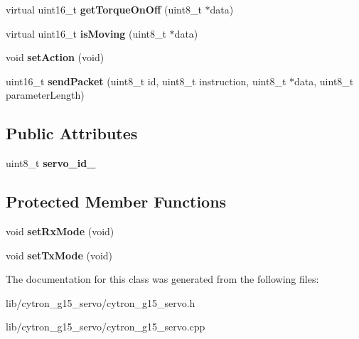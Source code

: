 \begin{DoxyCompactItemize}
\item 
virtual uint16\+\_\+t {\bfseries get\+Torque\+On\+Off} (uint8\+\_\+t $\ast$data)\hypertarget{classCytron__G15__Servo_a8d219ed8406313c53a00bddf81b90677}{}\label{classCytron__G15__Servo_a8d219ed8406313c53a00bddf81b90677}

\item 
virtual uint16\+\_\+t {\bfseries is\+Moving} (uint8\+\_\+t $\ast$data)\hypertarget{classCytron__G15__Servo_a3854ba546f35b228dc99c7c9d60bb000}{}\label{classCytron__G15__Servo_a3854ba546f35b228dc99c7c9d60bb000}

\item 
void {\bfseries set\+Action} (void)\hypertarget{classCytron__G15__Servo_a1552f7f170eb517fa76079557d9a29d5}{}\label{classCytron__G15__Servo_a1552f7f170eb517fa76079557d9a29d5}

\item 
uint16\+\_\+t {\bfseries send\+Packet} (uint8\+\_\+t id, uint8\+\_\+t instruction, uint8\+\_\+t $\ast$data, uint8\+\_\+t parameter\+Length)\hypertarget{classCytron__G15__Servo_aaab32bae80c27bc72522eb6b029a6b84}{}\label{classCytron__G15__Servo_aaab32bae80c27bc72522eb6b029a6b84}

\end{DoxyCompactItemize}
\subsection*{Public Attributes}
\begin{DoxyCompactItemize}
\item 
uint8\+\_\+t {\bfseries servo\+\_\+id\+\_\+}\hypertarget{classCytron__G15__Servo_a82c996820f49b5298d15f0628e8f2a93}{}\label{classCytron__G15__Servo_a82c996820f49b5298d15f0628e8f2a93}

\end{DoxyCompactItemize}
\subsection*{Protected Member Functions}
\begin{DoxyCompactItemize}
\item 
void {\bfseries set\+Rx\+Mode} (void)\hypertarget{classCytron__G15__Servo_a013a1a4a96fbc62a080f98cac3045e3f}{}\label{classCytron__G15__Servo_a013a1a4a96fbc62a080f98cac3045e3f}

\item 
void {\bfseries set\+Tx\+Mode} (void)\hypertarget{classCytron__G15__Servo_a4946f6a94bdf877f189261001501c5d4}{}\label{classCytron__G15__Servo_a4946f6a94bdf877f189261001501c5d4}

\end{DoxyCompactItemize}


The documentation for this class was generated from the following files\+:\begin{DoxyCompactItemize}
\item 
lib/cytron\+\_\+g15\+\_\+servo/cytron\+\_\+g15\+\_\+servo.\+h\item 
lib/cytron\+\_\+g15\+\_\+servo/cytron\+\_\+g15\+\_\+servo.\+cpp\end{DoxyCompactItemize}
